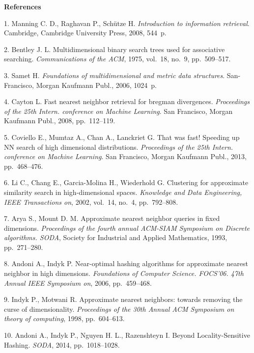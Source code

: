 
{\small

\vskip6mm

\noindent \textbf{References} }

\vskip 3mm%

{\footnotesize

1. Manning C. D., Raghavan P., Sch\"utze H. \textit{Introduction
to information retrieval}. Cambridge, Cambridge University Press,
2008, 544~p.

2. Bentley J. L. Multidimensional binary search trees used for
associative searching. \textit{Communications of the ACM}, 1975,
vol.~18, no.~9, pp.~509--517.

3. Samet H. \textit{Foundations of multidimensional and metric
data structures}. San-Francisco, Morgan Kaufmann Publ., 2006,
1024~p.

4. Cayton L. Fast nearest neighbor retrieval for bregman
divergences. \textit{Proceedings of the 25th Intern. conference on
Machine Learning}. San Francisco, Morgan Kaufmann Publ., 2008,
pp.~112--119.

5. Coviello E., Mumtaz A., Chan A., Lanckriet G. That was fast!
Speeding up NN search of high dimensional distributions.
\textit{Proceedings of the 25th Intern. conference on Machine
Learning}. San Francisco, Morgan Kaufmann Publ., 2013,
pp.~468--476.

6. Li C., Chang E., Garcia-Molina H., Wiederhold G. Clustering for
approximate similarity search in high-dimensional spaces.
\textit{Knowledge and Data Engineering, IEEE Transactions on},
2002, vol.~14, no.~4, pp.~792--808.

7. Arya S., Mount D. M. Approximate nearest neighbor queries in
fixed dimensions. \textit{Proceedings of the fourth annual
ACM-SIAM Symposium on Discrete algorithms. SODA}, Society for
Industrial and Applied Mathematics, 1993, pp.~271--280.

8. Andoni A., Indyk P. Near-optimal hashing algorithms for
approximate nearest neighbor in high dimensions.
\textit{Foundations of Computer Science. FOCS'06. 47th Annual IEEE
Symposium on}, 2006, pp.~459--468.

9. Indyk P., Motwani R. Approximate nearest neighbors: towards
removing the curse of dimensionality. \textit{Proceedings of the
30th Annual ACM Symposium on theory of computing}, 1998,\linebreak
pp.~604--613.

10. Andoni A., Indyk P., Nguyen H. L., Razenshteyn I. Beyond
Locality-Sensitive Hashing. \textit{SODA}, 2014, pp.~1018--1028.

}

